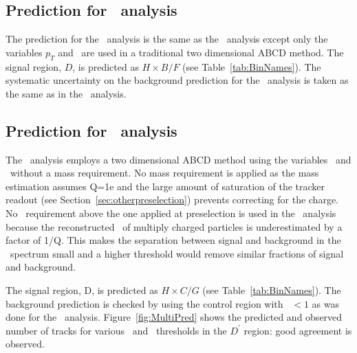 \subsection{Prediction for \tkonly\ analysis}

The prediction for the \tkonly\ analysis is the same as the \tktof\ analysis except only the variables $p_T$ and \ias\ are used in a traditional two
dimensional ABCD method. 
The signal region, $D$, is predicted as $H \times B / F$ (see Table~\ref{tab:BinNames}).
The systematic uncertainty on the background prediction for the \tkonly\ analysis is taken as the same as in the \tktof\ analysis.

\subsection{Prediction for \multi\ analysis}

The \multi\ analysis employs a two dimensional ABCD method using the variables \invbeta\ and \ias\ without a mass requirement. No mass requirement is applied as the mass
estimation assumes Q=1e and the large amount of saturation of the tracker readout (see Section~\ref{sec:otherpreselection}) prevents correcting for the charge.
No \pt\ requirement above the one applied at preselection is used in the \multi\ analysis because the reconstructed \pt\ of
multiply charged particles is underestimated by a factor of 1/Q. This makes the separation between signal and background in the \pt\ spectrum small and a
higher threshold would remove similar fractions of signal and background.

The signal region, D, is predicted as $H \times C / G$ (see Table~\ref{tab:BinNames}).
The background prediction is checked by using 
the control region with \invbeta\ $< 1$ as was done for the \muononly\ analysis.
Figure~\ref{fig:MultiPred} shows the predicted and observed number of tracks for various \invbeta\ and \ias\ thresholds in the $D^{\prime}$ region: good agreement is observed.

